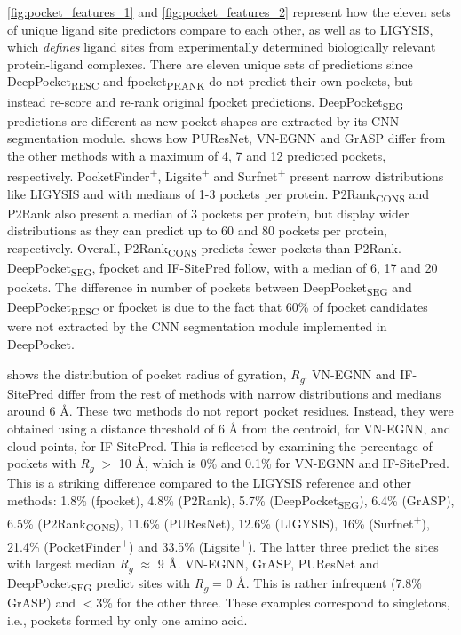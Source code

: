 \autoref{fig:pocket_features_1} and \autoref{fig:pocket_features_2} represent how the eleven sets of unique ligand site predictors compare to each other, as well as to LIGYSIS, which \textit{defines} ligand sites from experimentally determined biologically relevant protein-ligand complexes. There are eleven unique sets of predictions since DeepPocket\textsubscript{RESC} and fpocket\textsubscript{PRANK} do not predict their own pockets, but instead re-score and re-rank original fpocket predictions. DeepPocket\textsubscript{SEG} predictions are different as new pocket shapes are extracted by its CNN segmentation module.  shows how PUResNet, VN-EGNN and GrASP differ from the other methods with a maximum of 4, 7 and 12 predicted pockets, respectively. PocketFinder\textsuperscript{+}, Ligsite\textsuperscript{+} and Surfnet\textsuperscript{+} present narrow distributions like LIGYSIS and with medians of 1-3 pockets per protein. P2Rank\textsubscript{CONS} and P2Rank also present a median of 3 pockets per protein, but display wider distributions as they can predict up to 60 and 80 pockets per protein, respectively. Overall, P2Rank\textsubscript{CONS} predicts fewer pockets than P2Rank. DeepPocket\textsubscript{SEG}, fpocket and IF-SitePred follow, with a median of 6, 17 and 20 pockets. The difference in number of pockets between DeepPocket\textsubscript{SEG} and DeepPocket\textsubscript{RESC} or fpocket is due to the fact that 60\% of fpocket candidates were not extracted by the CNN segmentation module implemented in DeepPocket.

 shows the distribution of pocket radius of gyration, \textit{R\textsubscript{g}}. VN-EGNN and IF-SitePred differ from the rest of methods with narrow distributions and medians around 6 \AA{}. These two methods do not report pocket residues. Instead, they were obtained using a distance threshold of 6 \AA{} from the centroid, for VN-EGNN, and cloud points, for IF-SitePred. This is reflected by examining the percentage of pockets with \textit{R\textsubscript{g}} $>$ 10 \AA{}, which is 0\% and 0.1\% for VN-EGNN and IF-SitePred. This is a striking difference compared to the LIGYSIS reference and other methods: 1.8\% (fpocket), 4.8\% (P2Rank), 5.7\% (DeepPocket\textsubscript{SEG}), 6.4\% (GrASP), 6.5\% (P2Rank\textsubscript{CONS}), 11.6\% (PUResNet), 12.6\% (LIGYSIS), 16\% (Surfnet\textsuperscript{+}), 21.4\% (PocketFinder\textsuperscript{+}) and 33.5\% (Ligsite\textsuperscript{+}). The latter three predict the sites with largest median \textit{R\textsubscript{g}} $\approx$ 9 \AA{}. VN-EGNN, GrASP, PUResNet and DeepPocket\textsubscript{SEG} predict sites with \textit{R\textsubscript{g}} = 0 \AA{}. This is rather infrequent (7.8\% GrASP) and $<$3\% for the other three. These examples correspond to singletons, i.e., pockets formed by only one amino acid.

